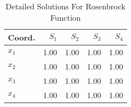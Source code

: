 \begin{table}
\centering
\caption{Detailed Solutions For Rosenbrock Function}
\label{detailedsolutions:rosenbrock4d}
\begin{tabular}{lrrrr}
\toprule
 Coord. &  $S_{1}$ &  $S_{2}$ &  $S_{3}$ &  $S_{4}$ \\
\midrule
$x_{1}$ &     1.00 &     1.00 &     1.00 &     1.00 \\
$x_{2}$ &     1.00 &     1.00 &     1.00 &     1.00 \\
$x_{3}$ &     1.00 &     1.00 &     1.00 &     1.00 \\
$x_{4}$ &     1.00 &     1.00 &     1.00 &     1.00 \\
\bottomrule
\end{tabular}
\end{table}
